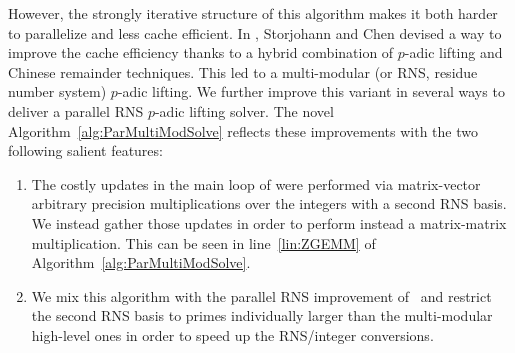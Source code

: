 However, the strongly iterative structure of this algorithm makes it both harder to parallelize and less cache
efficient.
In \cite{ChSt05}, Storjohann and Chen devised a way to improve the cache efficiency thanks to a hybrid combination of
$p$-adic lifting and Chinese remainder techniques. 
This led to a multi-modular (or RNS, residue number system) $p$-adic
lifting.
We further improve this variant in several ways to deliver a parallel
RNS $p$-adic lifting solver. The novel
Algorithm~\ref{alg:ParMultiModSolve} reflects these improvements with
the two following salient features:
\begin{enumerate}
\item The costly updates in the main loop of \cite{ChSt05} were
  performed via matrix-vector arbitrary precision multiplications over
  the integers with a second RNS basis.
  We instead gather those updates in order to perform instead a
  matrix-matrix multiplication. 
  This can be seen in line~\ref{lin:ZGEMM} of
  Algorithm~\ref{alg:ParMultiModSolve}.
\item We mix this algorithm with the parallel RNS improvement
  of~\cite{DGLS18} and restrict the second RNS basis to primes
  individually larger than the 
  multi-modular high-level ones in order to speed up the RNS/integer
  conversions. 
\end{enumerate}


